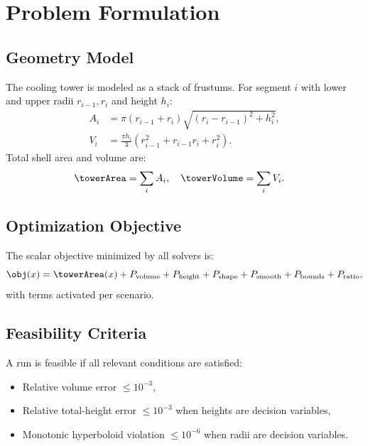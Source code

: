\chapter{Problem Formulation}

\section{Geometry Model}
The cooling tower is modeled as a stack of frustums.
For segment $i$ with lower and upper radii $r_{i-1}, r_i$ and height $h_i$:
\begin{align}
A_i &= \pi (r_{i-1} + r_i)\sqrt{(r_i-r_{i-1})^2 + h_i^2},\\
V_i &= \frac{\pi h_i}{3}\left(r_{i-1}^2 + r_{i-1}r_i + r_i^2\right).
\end{align}
Total shell area and volume are:
\begin{align}
\towerArea &= \sum_i A_i,\quad
\towerVolume = \sum_i V_i.
\end{align}

\section{Optimization Objective}
The scalar objective minimized by all solvers is:
\begin{equation}
\obj(x) = \towerArea(x) + P_{\mathrm{volume}} + P_{\mathrm{height}} + P_{\mathrm{shape}} + P_{\mathrm{smooth}} + P_{\mathrm{bounds}} + P_{\mathrm{ratio}},
\end{equation}
with terms activated per scenario.

\section{Feasibility Criteria}
A run is feasible if all relevant conditions are satisfied:
\begin{itemize}[leftmargin=1.5em]
\item Relative volume error $\le 10^{-3}$,
\item Relative total-height error $\le 10^{-3}$ when heights are decision variables,
\item Monotonic hyperboloid violation $\le 10^{-6}$ when radii are decision variables.
\end{itemize}
